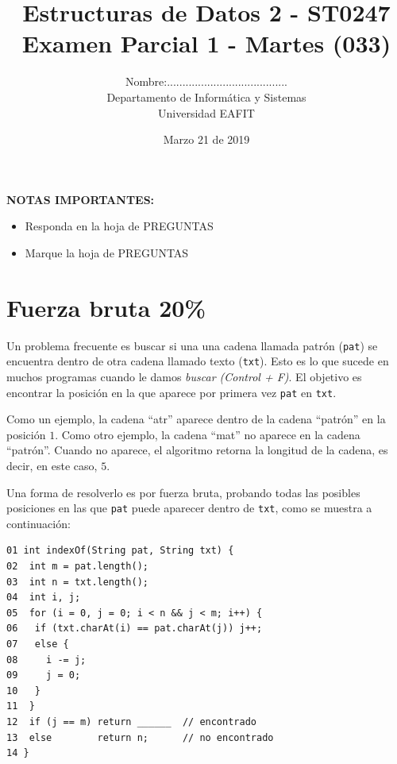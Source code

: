 \documentclass[twocolumn]{article}
\author{
Nombre:....................................... \\
    Departamento de Informática y Sistemas \\
    Universidad EAFIT \\
}
\title{
    Estructuras de Datos 2 - ST0247 \\
    Examen Parcial 1 - Martes (033)
}
\date{
    Marzo 21 de 2019
}
\begin{document}
\lstset{escapechar=@,style=customc, numbers=left, stepnumber = 1} 
\vspace{-5cm}
\maketitle



\textbf{NOTAS IMPORTANTES:}
\begin{itemize}
	\item Responda en la hoja de PREGUNTAS
	\item Marque la hoja de PREGUNTAS
\end{itemize}
\section{Fuerza bruta 20\%}
Un problema frecuente es buscar si una una cadena llamada patrón (\texttt{pat})
se encuentra dentro de otra cadena llamado texto (\texttt{txt}). Esto es lo que sucede 
en muchos programas cuando le damos \emph{buscar (Control + F)}. El objetivo es
encontrar la posición en la que aparece por primera vez \texttt{pat} en \texttt{txt}.

Como un ejemplo, la cadena ``atr'' aparece dentro de la cadena ``patrón'' en la posición
$1$. Como otro ejemplo, la cadena ``mat'' no aparece en la cadena ``patrón''. Cuando
no aparece, el algoritmo retorna la longitud de la cadena, es decir, en este caso, $5$.

Una forma de resolverlo es por fuerza bruta, probando todas las posibles posiciones
en las que \texttt{pat} puede aparecer dentro de \texttt{txt}, como se muestra a continuación:

{\small
\begin{verbatim}
01 int indexOf(String pat, String txt) {
02  int m = pat.length();
03  int n = txt.length();
04  int i, j;
05  for (i = 0, j = 0; i < n && j < m; i++) {
06   if (txt.charAt(i) == pat.charAt(j)) j++;
07   else {
08     i -= j;
09     j = 0;
10   }
11  }
12  if (j == m) return ______  // encontrado
13  else        return n;      // no encontrado
14 }
\end{verbatim}
}
\end{document}
